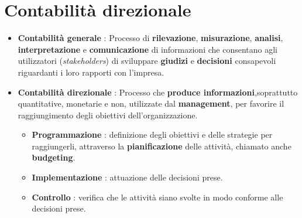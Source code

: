\documentclass{article}
\begin{document}
\section{Contabilità direzionale}
\begin{itemize}
    \item \textbf{Contabilità generale} : Processo di \textbf{rilevazione}, \textbf{misurazione}, \textbf{analisi}, \textbf{interpretazione} e \textbf{comunicazione} di informazioni che consentano agli utilizzatori (\textit{stakeholders}) di sviluppare \textbf{giudizi} e \textbf{decisioni} consapevoli riguardanti i loro rapporti con l’impresa.
    \item \textbf{Contabilità direzionale} : Processo che \textbf{produce informazioni},soprattutto quantitative, monetarie e non, utilizzate dal \textbf{management}, per favorire il raggiungimento degli obiettivi dell'organizzazione.\begin{itemize}
              \item \textbf{Programmazione} : definizione degli obiettivi e delle strategie per raggiungerli, attraverso la \textbf{pianificazione} delle attività, chiamato anche \textbf{budgeting}.
              \item \textbf{Implementazione} : attuazione delle decisioni prese.
              \item \textbf{Controllo} : verifica che le attività siano svolte in modo conforme alle decisioni prese.
          \end{itemize}
\end{itemize}
\end{document}
